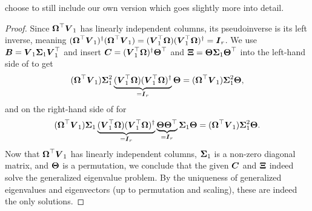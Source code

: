 choose to still include our own version which goes slightly more into detail.
\begin{proof}
    Since $\boldsymbol{\Omega}^{\top} \boldsymbol{V}_1$ has linearly independent columns, its
    pseudoinverse is its left inverse, meaning 
    $(\boldsymbol{\Omega}^{\top} \boldsymbol{V}_1)^{\dagger} (\boldsymbol{\Omega}^{\top} \boldsymbol{V}_1) = ( \boldsymbol{V}_1^{\top}\boldsymbol{\Omega}) ( \boldsymbol{V}_1^{\top}\boldsymbol{\Omega})^{\dagger} = \boldsymbol{I}_r$.
    We use $\boldsymbol{B} = \boldsymbol{V}_1 \boldsymbol{\Sigma}_1 \boldsymbol{V}_1^{\top}$ and insert
    $\boldsymbol{C} = (\boldsymbol{V}_1^{\top} \boldsymbol{\Omega})^{\dagger} \boldsymbol{\Theta}^{\top}$
    and $\boldsymbol{\Xi} = \boldsymbol{\Theta} \boldsymbol{\Sigma}_1 \boldsymbol{\Theta}^{\top}$ into the
    left-hand side of  to get
    \begin{equation}
        (\boldsymbol{\Omega}^{\top} \boldsymbol{V}_1) \boldsymbol{\Sigma}_1^2 \underbrace{(\boldsymbol{V}_1^{\top} \boldsymbol{\Omega}) (\boldsymbol{V}_1^{\top} \boldsymbol{\Omega})^{\dagger}}_{=\boldsymbol{I}_r} \boldsymbol{\Theta} = (\boldsymbol{\Omega}^{\top} \boldsymbol{V}_1) \boldsymbol{\Sigma}_1^2 \boldsymbol{\Theta},
    \end{equation}
    and on the right-hand side of  for
    \begin{equation}
        (\boldsymbol{\Omega}^{\top} \boldsymbol{V}_1) \boldsymbol{\Sigma}_1 \underbrace{(\boldsymbol{V}_1^{\top} \boldsymbol{\Omega}) (\boldsymbol{V}_1^{\top} \boldsymbol{\Omega})^{\dagger}}_{=\boldsymbol{I}_r} \underbrace{\boldsymbol{\Theta} \boldsymbol{\Theta}^{\top}}_{=\boldsymbol{I}_r} \boldsymbol{\Sigma}_1 \boldsymbol{\Theta} = (\boldsymbol{\Omega}^{\top} \boldsymbol{V}_1) \boldsymbol{\Sigma}_1^2 \boldsymbol{\Theta}.
    \end{equation}
    Now that $\boldsymbol{\Omega}^{\top} \boldsymbol{V}_1$ has linearly independent columns, $\boldsymbol{\Sigma}_1$ is a non-zero
    diagonal matrix, and $\boldsymbol{\Theta}$ is a permutation, we conclude that
    the given $\boldsymbol{C}$ and $\boldsymbol{\Xi}$ indeed solve the generalized eigenvalue problem.
    By the uniqueness of generalized eigenvalues and eigenvectors (up to
    permutation and scaling), these are indeed the only solutions.


\end{proof}
